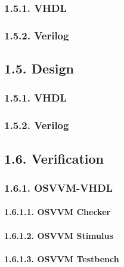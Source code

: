 \documentclass[
]{article}
\begin{document}
\hypertarget{vhdl-4}{%
\subsubsection{1.5.1. VHDL}\label{vhdl-4}}

\hypertarget{verilog-4}{%
\subsubsection{1.5.2. Verilog}\label{verilog-4}}

\hypertarget{design-1}{%
\subsection{1.5. Design}\label{design-1}}

\hypertarget{vhdl-5}{%
\subsubsection{1.5.1. VHDL}\label{vhdl-5}}

\hypertarget{verilog-5}{%
\subsubsection{1.5.2. Verilog}\label{verilog-5}}

\hypertarget{verification-1}{%
\subsection{1.6. Verification}\label{verification-1}}

\hypertarget{osvvm-vhdl-1}{%
\subsubsection{1.6.1. OSVVM-VHDL}\label{osvvm-vhdl-1}}

\hypertarget{osvvm-checker-1}{%
\paragraph{1.6.1.1. OSVVM Checker}\label{osvvm-checker-1}}

\hypertarget{osvvm-stimulus-1}{%
\paragraph{1.6.1.2. OSVVM Stimulus}\label{osvvm-stimulus-1}}

\hypertarget{osvvm-testbench-1}{%
\paragraph{1.6.1.3. OSVVM Testbench}\label{osvvm-testbench-1}}
\end{document}
